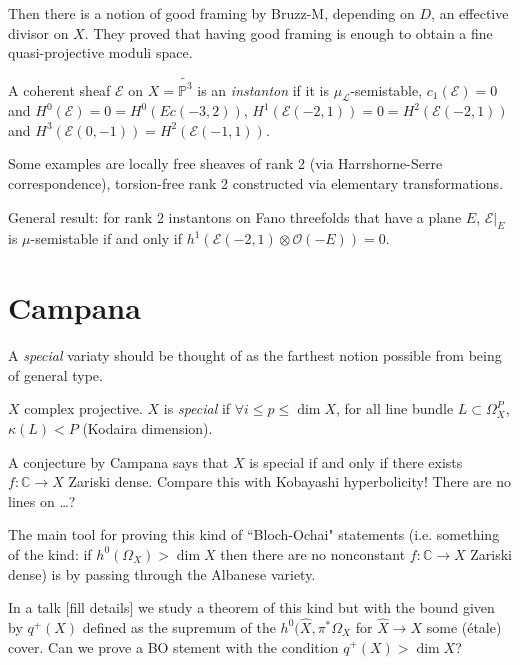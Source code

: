 \medskip\noindent
Then there is a notion of good framing by Bruzz-M,
depending on $D$, an effective divisor on $X$.
They proved that having good framing is enough
to obtain a fine quasi-projective moduli space.

\begin{definition}
\label{definition-instanton}
A coherent sheaf $\mathcal{E}$ on $X=\tilde{\mathbb{P}^3}$ 
is an {\it instanton} if it is $\mu_{\mathcal{L}}$-semistable,
$c_1(\mathcal{E})=0$ and $H^0(\mathcal{E})=0=H^0(Ec(-3,2))$,
$H^1(\mathcal{E}(-2,1))=0=H^2(\mathcal{E}(-2,1))$ and
$H^3(\mathcal{E}(0,-1))=H^2(\mathcal{E}(-1,1))$.
\end{definition}

\noindent
Some examples are locally free sheaves of rank 2 (via Harrshorne-Serre
correspondence),
torsion-free rank 2 constructed via elementary
transformations.

\medskip\noindent
General result: for rank 2 instantons on Fano threefolds
that have a plane $E$, 
$\mathcal{E}|_{E}$ is $\mu$-semistable
if and only if $h^1(\mathcal{E}(-2,1) \otimes \mathcal{O}(-E))=0$.




\section{Campana}

A \textit{special} variaty should be thought of 
as the farthest notion possible from being of general type.

\begin{definition}[Campana]
$X$ complex projective.
$X$ is \textit{special} if $\forall i \leq  p \leq \dim X$,
for all line bundle $L \subset \Omega^P_X$,
$\kappa(L)<P$ (Kodaira dimension).
\end{definition}

\noindent
A conjecture by Campana says that
$X$ is special if and only if there exists  $f:\mathbb{C}\to X$
Zariski dense.
Compare this with Kobayashi hyperbolicity!
There are no lines on …?

The main tool for proving this kind of
``Bloch-Ochai" statements (i.e.
something of the kind: if $h^0(\Omega_X)> \dim X$
then there are no nonconstant $f:\mathbb{C}\to X$
Zariski dense)
is by passing through the Albanese variety.

In a talk [fill details]
we study a theorem of this kind but with the bound
given by $q^+(X)$ defined as the supremum of the $h^0(\hat{X},\pi^*\Omega_{X}$
for $\hat{X}\to X$ some (étale) cover.
Can we prove a BO stement with the condition
$q^+(X)>\dim X$?

